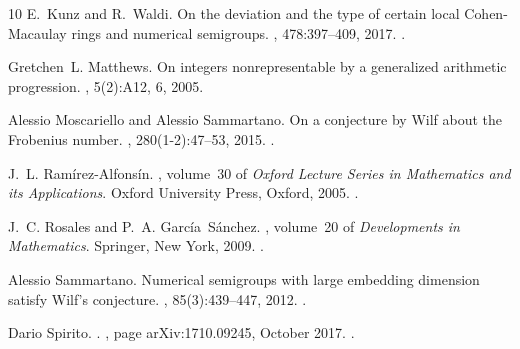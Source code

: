 \begin{thebibliography}{10}
E.~Kunz and R.~Waldi.
\newblock On the deviation and the type of certain local {C}ohen-{M}acaulay
  rings and numerical semigroups.
, 478:397--409, 2017.
\newblock \href {http://dx.doi.org/10.1016/j.jalgebra.2017.01.041}
  {}.

Gretchen~L. Matthews.
\newblock On integers nonrepresentable by a generalized arithmetic progression.
, 5(2):A12, 6, 2005.

Alessio Moscariello and Alessio Sammartano.
\newblock On a conjecture by {W}ilf about the {F}robenius number.
, 280(1-2):47--53, 2015.
\newblock \href {http://dx.doi.org/10.1007/s00209-015-1412-0}
  {}.

J.~L. Ramírez-Alfonsín.
, volume~30 of {\em Oxford
  Lecture Series in Mathematics and its Applications}.
\newblock Oxford University Press, Oxford, 2005.
\newblock \href {http://dx.doi.org/10.1093/acprof:oso/9780198568209.001.0001}
  {}.

J.~C. Rosales and P.~A. García~Sánchez.
, volume~20 of {\em Developments in
  Mathematics}.
\newblock Springer, New York, 2009.
\newblock \href {http://dx.doi.org/10.1007/978-1-4419-0160-6}
  {}.

Alessio Sammartano.
\newblock Numerical semigroups with large embedding dimension satisfy {W}ilf's
  conjecture.
, 85(3):439--447, 2012.
\newblock \href {http://dx.doi.org/10.1007/s00233-011-9370-2}
  {}.

Dario {Spirito}.
.
, page arXiv:1710.09245, October 2017.
\newblock \href {http://arxiv.org/abs/1710.09245} {}.


\end{thebibliography}

